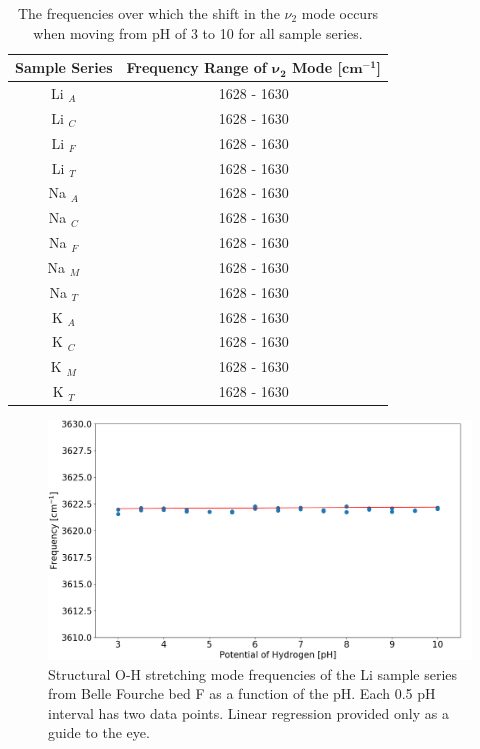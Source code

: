 \begin{table}
	\centering
	\caption{The frequencies over which the shift in the $\nu_2$ mode occurs when moving from pH of 3 to 10 for all sample series.}
	\label{tab:deformation_shifts}
	\begin{tabular}{|c||c|}
		\hline
		\textbf{Sample Series} & \textbf{Frequency Range of $\bm{\nu_2}$ Mode [$\bm{cm^{-1}}$]} \\
		\hline
		\hline
		Li $_A$ & 1628 - 1630 \\
		\hline
		Li $_C$ & 1628 - 1630 \\
		\hline
		Li $_F$ & 1628 - 1630 \\
		\hline
		Li $_T$ & 1628 - 1630 \\
		\hline
		Na $_A$ & 1628 - 1630 \\
		\hline
		Na $_C$ & 1628 - 1630 \\
		\hline
		Na $_F$ & 1628 - 1630 \\
		\hline
		Na $_M$ & 1628 - 1630 \\
		\hline
		Na $_T$ & 1628 - 1630 \\
		\hline
		K $_A$ & 1628 - 1630 \\
		\hline
		K $_C$ & 1628 - 1630 \\
		\hline
		K $_M$ & 1628 - 1630 \\
		\hline
		K $_T$ & 1628 - 1630 \\
		\hline
	\end{tabular}
\end{table}

\begin{figure}
	\centering
	\includegraphics[scale=0.5]{images/hydrx_shift.png}
	\caption{Structural O-H stretching mode frequencies of the Li sample series from Belle Fourche bed F as a function of the pH. Each 0.5 pH interval has two data points. Linear regression provided only as a guide to the eye.}
	\label{fig:hydroxyl_shift}
\end{figure}

